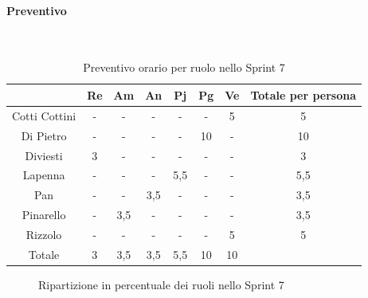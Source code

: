 \documentclass{article}
\begin{document}
                \paragraph{Preventivo}\mbox{}\\
                \begin{table}[H]
                    \centering
                    \begin{tabular}{|c|c|c|c|c|c|c|c|}
                    \hline
                                  & Re  & Am  & An  & Pj  & Pg  & Ve  & Totale per persona \\ \hline
                    Cotti Cottini & -   & -   & -   & -   & -   & 5   & 5                  \\ \hline
                    Di Pietro     & -   & -   & -   & -   & 10  & -   & 10                 \\ \hline
                    Diviesti      & 3   & -   & -   & -   & -   & -   & 3                  \\ \hline
                    Lapenna       & -   & -   & -   & 5,5 & -   & -   & 5,5                \\ \hline
                    Pan           & -   & -   & 3,5 & -   & -   & -   & 3,5                \\ \hline
                    Pinarello     & -   & 3,5 & -   & -   & -   & -   & 3,5                \\ \hline
                    Rizzolo       & -   & -   & -   & -   & -   & 5   & 5                  \\ \hline
                    Totale        & 3   & 3,5 & 3,5 & 5,5 & 10  & 10  &                    \\ \hline
                    \end{tabular}
                    \caption{Preventivo orario per ruolo nello Sprint 7}
                \end{table}


                \begin{figure}[H]
                    \centering
                    \caption{Ripartizione in percentuale dei ruoli nello Sprint 7}
                \end{figure}


\end{document}
